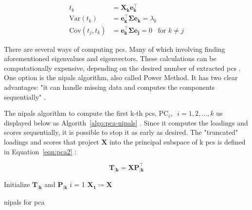 \begin{equation}
	\label{eqn:pca-eigen}
	\begin{split}
		t_k & =\mathbf{X_k e_k^\intercal} \\
		\text{Var}(t_k)& =  \mathbf{e_k^\intercal \Sigma e_k}=\lambda_k \\
		\text{Cov}(t_j, t_k)& = \mathbf{e_k^\intercal \Sigma e_j}= 0 \;\;\; \text{for } k\neq j
	\end{split}
\end{equation}

There are several ways of computing \acrshort{pc}s. Many of which involving finding aforementioned eigenvalues and eigenvectors. These calculations can be computationally expensive, depending on the desired number of extracted \acrshort{pc}s \parencite{bishop2006pattern}. One option is the \acrfull{nipals} algorithm, also called Power Method. It has two clear advantages: "it can handle missing data and computes the components sequentially" \parencite{dunn2021pid}.

The \acrshort{nipals} algorithm to compute the first k-th \acrshort{pc}s, $\text{PC}_i ,\;\; i =1,2,...,k$ us displayed below as Algorith~\ref{algo:pca-nipals} \parencite{dunn2021pid} \parencite{ng2013} \parencite{nipals2017}. Since it computes the loadings and scores sequentially, it is possible to stop it as early as desired. The "truncated" loadings and scores that project $\mathbf{X}$ into the principal subspace of k \acrshort{pc}s is defined in Equation~\ref{eqn:pca2} :

\begin{equation}
	\label{eqn:pca2}
	\mathbf{T_{|k}=XP_{|k}^\intercal}
\end{equation}

\begin{algorithm}[H]
	\DontPrintSemicolon
	\label{algo:pca-nipals}
	\SetAlgoLined
	Initialize $\mathbf{T_{|k}}$ and $\mathbf{P_{|k}}$\;
	i = 1\;
	$\mathbf{X_1 \coloneqq X}$\;
	
	
	\caption{\acrfull{nipals} for \acrshort{pca}}
\end{algorithm}

